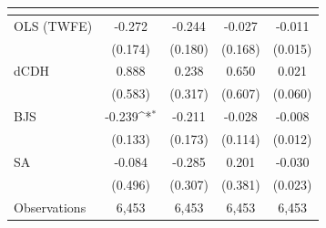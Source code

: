 {
\def\sym#1{\ifmmode^{#1}\else\(^{#1}\)\fi}
\begin{tabular}{l*{4}{c}}
\toprule
            &&&&\\
\midrule
OLS (TWFE) & -0.272 & -0.244 & -0.027 & -0.011 \\
             & (0.174) & (0.180) & (0.168) & (0.015) \\
dCDH & 0.888 & 0.238 & 0.650 & 0.021 \\
             & (0.583) & (0.317) & (0.607) & (0.060) \\
BJS & -0.239\sym{*} & -0.211 & -0.028 & -0.008 \\
             & (0.133) & (0.173) & (0.114) & (0.012) \\
SA & -0.084 & -0.285 & 0.201 & -0.030 \\
             & (0.496) & (0.307) & (0.381) & (0.023) \\
\midrule
Observations & 6,453 & 6,453 & 6,453 & 6,453 \\
\bottomrule
\end{tabular}
}

